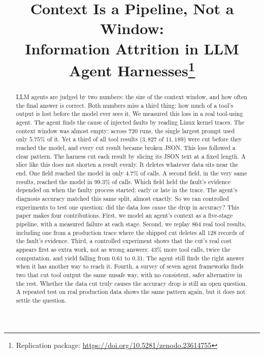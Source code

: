 \documentclass[10pt,conference]{IEEEtran}
\begin{document}
\title{Context Is a Pipeline, Not a Window:\\
Information Attrition in LLM Agent Harnesses\thanks{Replication package:
\url{https://doi.org/10.5281/zenodo.23614755}}}

\author{
}

\maketitle

\begin{abstract}
LLM agents are judged by two numbers: the size of the context window, and
how often the final answer is correct. Both numbers miss a third thing: how
much of a tool's output is lost before the model ever sees it. We measured
this loss in a real tool-using agent. The agent finds the cause of injected
faults by reading Linux kernel traces. The context window was almost empty:
across $720$ runs, the single largest prompt used only $5.75\%$ of it. Yet a
third of all tool results ($3{,}827$ of $11{,}189$) were cut before they
reached the model, and every cut result became broken JSON. This loss
followed a clear pattern. The harness cut each result by slicing its JSON
text at a fixed length. A slice like this does not shorten a result evenly.
It deletes whatever data sits near the end. One field reached the model in
only $4.7\%$ of calls. A second field, in the very same results, reached the
model in $99.3\%$ of calls. Which field held the fault's evidence depended
on when the faulty process started: early or late in the trace. The agent's
diagnosis accuracy matched this same split, almost exactly. So we ran
controlled experiments to test one question: did the data loss
\emph{cause} the drop in accuracy? This paper makes four contributions.
First, we model an agent's context as a five-stage pipeline, with a
measured failure at each stage. Second, we replay $864$ real tool results,
including one from a production trace where the shipped cut deletes all
$128$ records of the fault's evidence. Third, a controlled experiment shows
that the cut's real cost appears first as extra work, not as wrong answers:
$43\%$ more tool calls, twice the computation, and yield falling from
$0.61$ to $0.31$. The agent still finds the right answer when it has
another way to reach it. Fourth, a survey of seven agent frameworks finds
two that cut tool output the same unsafe way, with no consistent, safer
alternative in the rest. Whether the data cut truly causes the accuracy
drop is still an open question. A repeated test on real production data
shows the same pattern again, but it does not settle the question.
\end{abstract}
\end{document}
